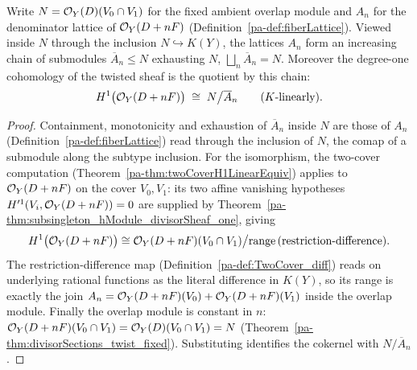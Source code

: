 \begin{definition}
  \label{pa-def:fiberLatticeH1Equiv}
  \leanok

  Write \(N = \mathcal{O}_{Y}(D)(V_0 \cap V_1)\) for the fixed ambient overlap module and \(A_n\) for the
  denominator lattice of \(\mathcal{O}_{Y}(D + nF)\) (Definition~\ref{pa-def:fiberLattice}). Viewed inside
  \(N\) through the inclusion \(N \hookrightarrow K(Y)\), the lattices \(A_n\) form an increasing
  chain of submodules \(\overline A_n \le N\) exhausting \(N\), \(\bigsqcup_n \overline A_n = N\).
  Moreover the degree-one cohomology of the twisted sheaf is the quotient by this chain:
  \[
    H^1\bigl(\mathcal{O}_{Y}(D + nF)\bigr) \;\cong\; N \big/ \overline A_n \qquad (K\text{-linearly}).
  \]
\end{definition}
\begin{proof}
  \leanok
  Containment, monotonicity and exhaustion of \(\overline A_n\) inside \(N\) are those of \(A_n\)
  (Definition~\ref{pa-def:fiberLattice}) read through the inclusion of \(N\), the comap of a submodule
  along the subtype inclusion. For the isomorphism, the two-cover computation
  (Theorem~\ref{pa-thm:twoCoverH1LinearEquiv}) applies to \(\mathcal{O}_{Y}(D + nF)\) on the cover \(V_0,
  V_1\): its two affine vanishing hypotheses \(H'^1(V_i, \mathcal{O}_{Y}(D + nF)) = 0\) are supplied by
  Theorem~\ref{pa-thm:subsingleton_hModule_divisorSheaf_one}, giving
  \[
    H^1\bigl(\mathcal{O}_{Y}(D + nF)\bigr) \cong \mathcal{O}_{Y}(D + nF)(V_0 \cap V_1) \big/
      \mathrm{range}\,(\text{restriction-difference}) .
  \]
  The restriction-difference map (Definition~\ref{pa-def:TwoCover_diff}) reads on underlying rational
  functions as the literal difference in \(K(Y)\), so its range is exactly the join \(A_n = \mathcal{O}_{Y}(D + nF)(V_0) + \mathcal{O}_{Y}(D + nF)(V_1)\) inside the overlap module. Finally the overlap module is
  constant in \(n\): \(\mathcal{O}_{Y}(D + nF)(V_0 \cap V_1) = \mathcal{O}_{Y}(D)(V_0 \cap V_1) = N\)
  (Theorem~\ref{pa-thm:divisorSections_twist_fixed}). Substituting identifies the cokernel with \(N /
  \overline A_n\).
\end{proof}

